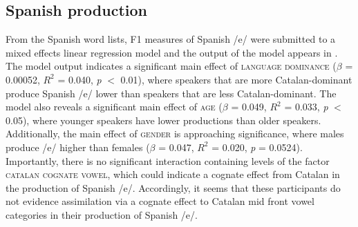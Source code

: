 \documentclass[output=paper,colorlinks,citecolor=brown,draftmode]{langscibook}
\begin{document}
\subsection{Spanish production}
    From the Spanish word lists, F1 measures of Spanish /e/ were submitted to a mixed effects linear regression model and the output of the model appears in  . The model output indicates a significant main effect of \textsc{language dominance} ($\beta$ = 0.00052, $R^{2}$ = 0.040, \emph{p} $<$ 0.01), where speakers that are more Catalan-dominant produce Spanish /e/ lower than speakers that are less Catalan-dom\-i\-nant. The model also reveals a significant main effect of \textsc{age} ($\beta$ = 0.049, $R^{2}$ = 0.033, \emph{p} $<$ 0.05), where younger speakers have lower productions than older speakers.  Additionally, the main effect of \textsc{gender} is approaching significance, where males produce /e/ higher than females ($\beta$ = 0.047, $R^{2}$ = 0.020, \emph{p} = 0.0524). Importantly, there is no significant interaction containing levels of the factor \textsc{catalan cognate vowel}, which could indicate a cognate effect from Catalan in the production of Spanish /e/. Accordingly, it seems that these participants do not evidence assimilation via a cognate effect to Catalan mid front vowel categories in their production of Spanish /e/.
\end{document}
